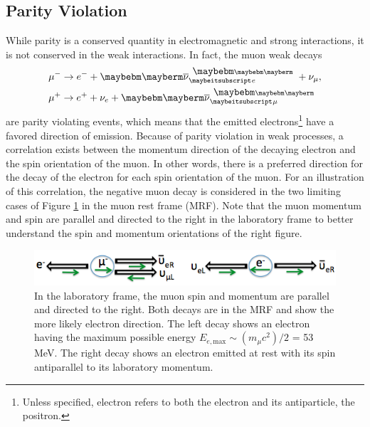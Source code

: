\documentclass{outhesis}
\begin{document}
\subsection{Parity Violation}
\label{sec:pv}
While parity is a conserved quantity in electromagnetic and strong interactions, it is not conserved in the weak interactions. 
In fact, the muon weak decays
\begin{equation}
\begin{split}
&\mu^- \rightarrow {e^-} + \HepAntiParticle{\nu}{e}{} + \nu_{\mu},\\
&\mu^+ \rightarrow {e^+} + \nu_e + \HepAntiParticle{\nu}{\mu}{}
\label{eq:decay}
\end{split}
\end{equation}
are parity violating events, which means that the emitted electrons\footnote{Unless specified, electron refers to both the electron and its antiparticle, the positron.} have a favored direction of emission. 
Because of parity violation in weak processes, a correlation exists between the momentum direction of the decaying electron and the spin orientation of the muon. In other words, there is a preferred direction for the decay of the electron for each spin orientation of the muon. For an illustration of this correlation, the negative muon decay is considered in the two limiting cases of Figure \ref{fig:muon} in the muon rest frame (MRF). Note that the muon momentum and spin are parallel and directed to the right in the laboratory frame to better understand the spin and momentum orientations of the right figure.
 \begin{figure}
  \centering
  \includegraphics[scale=0.5]{figures/mu_decay}
  \caption[Muon decay]{In the laboratory frame, the muon spin and momentum are parallel and directed to the right. Both decays are in the MRF and show the more likely electron direction. The left decay shows an electron having the maximum possible energy $E_{e,\text{max}}\sim \left(m_{\mu}c^2\right)/2$ = 53 MeV. The right decay shows an electron emitted at rest with its spin antiparallel to its laboratory momentum. }
  \label{fig:muon}
\end{figure}
\end{document}
